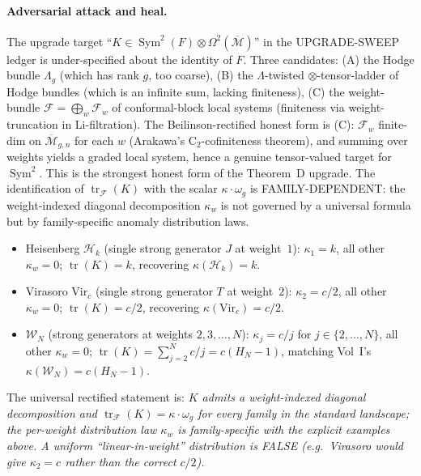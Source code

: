 \documentclass[11pt]{article}
\begin{document}
\paragraph{Adversarial attack and heal.} The upgrade target
``$K \in \operatorname{Sym}^2(F) \otimes \Omega^2(\overline{\mathcal{M}})$''
in the UPGRADE-SWEEP ledger is under-specified about the identity
of $F$. Three candidates: (A) the Hodge bundle $\Lambda_g$
(which has rank $g$, too coarse), (B) the $\Lambda$-twisted
$\otimes$-tensor-ladder of Hodge bundles (which is an infinite
sum, lacking finiteness), (C) the weight-bundle
$\mathcal{F} = \bigoplus_w \mathcal{F}_w$ of conformal-block local
systems (finiteness via weight-truncation in Li-filtration). The
Beilinson-rectified honest form is (C): $\mathcal{F}_w$ finite-dim
on $\overline{\mathcal{M}}_{g,n}$ for each $w$ (Arakawa's
C$_2$-cofiniteness theorem), and summing over weights yields a
graded local system, hence a genuine tensor-valued target for
$\operatorname{Sym}^2$. This is the strongest honest form of the
Theorem~D upgrade. The identification of
$\operatorname{tr}_\mathcal{F}(K)$ with the scalar
$\kappa \cdot \omega_g$ is FAMILY-DEPENDENT: the weight-indexed
diagonal decomposition $\kappa_w$ is not governed by a universal
formula but by family-specific anomaly distribution laws.
\begin{itemize}
\item Heisenberg $\mathcal{H}_k$ (single strong generator $J$ at
  weight~$1$): $\kappa_1 = k$, all other $\kappa_w = 0$;
  $\operatorname{tr}(K) = k$, recovering
  $\kappa(\mathcal{H}_k) = k$.
\item Virasoro $\mathrm{Vir}_c$ (single strong generator $T$ at
  weight~$2$): $\kappa_2 = c/2$, all other $\kappa_w = 0$;
  $\operatorname{tr}(K) = c/2$, recovering
  $\kappa(\mathrm{Vir}_c) = c/2$.
\item $\mathcal{W}_N$ (strong generators at weights
  $2, 3, \ldots, N$): $\kappa_j = c/j$ for
  $j \in \{2, \ldots, N\}$, all other $\kappa_w = 0$;
  $\operatorname{tr}(K) = \sum_{j=2}^N c/j = c(H_N - 1)$,
  matching Vol~I's $\kappa(\mathcal{W}_N) = c(H_N - 1)$.
\end{itemize}
The universal rectified statement is: \emph{$K$ admits a
weight-indexed diagonal decomposition and
$\operatorname{tr}_\mathcal{F}(K) = \kappa \cdot \omega_g$ for
every family in the standard landscape; the per-weight
distribution law $\kappa_w$ is family-specific with the explicit
examples above. A uniform ``linear-in-weight'' distribution is
FALSE (e.g.\ Virasoro would give $\kappa_2 = c$ rather than the
correct $c/2$).}
\end{document}
